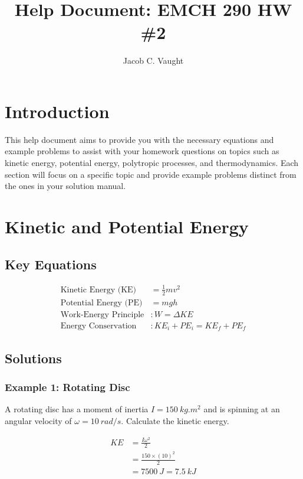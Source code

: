 \documentclass{article}
\title{Help Document: EMCH 290 HW \#2}
\author{Jacob C. Vaught}
\begin{document}
\maketitle

\section*{Introduction}
This help document aims to provide you with the necessary equations and example problems to assist with your homework questions on topics such as kinetic energy, potential energy, polytropic processes, and thermodynamics. Each section will focus on a specific topic and provide example problems distinct from the ones in your solution manual.

\section*{Kinetic and Potential Energy}

\subsection*{Key Equations}
\begin{align*}
    \text{Kinetic Energy (KE)} &= \frac{1}{2}mv^2 \\
    \text{Potential Energy (PE)} &= mgh \\
    \text{Work-Energy Principle} & : W = \Delta KE \\
    \text{Energy Conservation} &: KE_i + PE_i = KE_f + PE_f
\end{align*}

\subsection*{Solutions}

\subsubsection*{Example 1: Rotating Disc}

A rotating disc has a moment of inertia \(I = \SI{150}{kg.m^2}\) and is spinning at an angular velocity of \(\omega = \SI{10}{rad/s}\). Calculate the kinetic energy.

\begin{align*}
    KE &= \frac{I \omega^2}{2} \\
    &= \frac{150 \times (10)^2}{2} \\
    &= \SI{7500}{J} = \SI{7.5}{kJ}
\end{align*}
\end{document}
